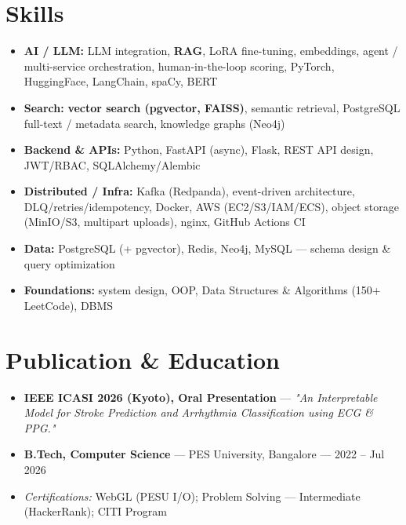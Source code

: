 \documentclass[10pt,a4paper]{article}
\begin{document}
\section*{Skills}
\begin{itemize}
\item \textbf{AI / LLM:} LLM integration, \textbf{RAG}, LoRA fine-tuning, embeddings, agent / multi-service orchestration, human-in-the-loop scoring, PyTorch, HuggingFace, LangChain, spaCy, BERT
\item \textbf{Search:} \textbf{vector search (pgvector, FAISS)}, semantic retrieval, PostgreSQL full-text / metadata search, knowledge graphs (Neo4j)
\item \textbf{Backend \& APIs:} Python, FastAPI (async), Flask, REST API design, JWT/RBAC, SQLAlchemy/Alembic
\item \textbf{Distributed / Infra:} Kafka (Redpanda), event-driven architecture, DLQ/retries/idempotency, Docker, AWS (EC2/S3/IAM/ECS), object storage (MinIO/S3, multipart uploads), nginx, GitHub Actions CI
\item \textbf{Data:} PostgreSQL (+ pgvector), Redis, Neo4j, MySQL --- schema design \& query optimization
\item \textbf{Foundations:} system design, OOP, Data Structures \& Algorithms (150+ LeetCode), DBMS
\end{itemize}
\section*{Publication \& Education}
\begin{itemize}
\item \textbf{IEEE ICASI 2026 (Kyoto), Oral Presentation} --- \textit{"An Interpretable Model for Stroke Prediction and Arrhythmia Classification using ECG \& PPG."}
\item \textbf{B.Tech, Computer Science} --- PES University, Bangalore --- 2022 -- Jul 2026
\item \textit{Certifications:} WebGL (PESU I/O); Problem Solving --- Intermediate (HackerRank); CITI Program
\end{itemize}
\end{document}

